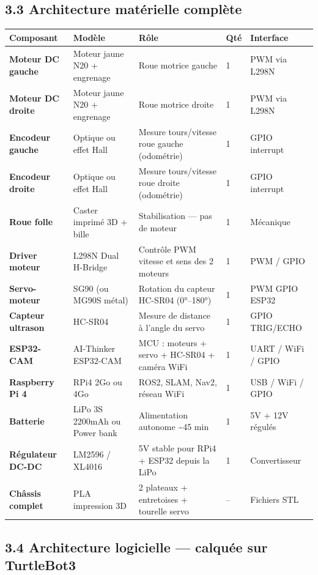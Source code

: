 \documentclass[12pt,a4paper]{article}
\begin{document}
\subsection{3.3 Architecture matérielle complète}

\begin{longtable}{>{\bfseries}p{2.8cm} p{3.2cm} p{3.5cm} p{0.6cm} p{2.2cm}}
\toprule
\textbf{Composant} & \textbf{Modèle} & \textbf{Rôle} & \textbf{Qté} & \textbf{Interface} \\
\midrule
\endhead
Moteur DC gauche & Moteur jaune N20 + engrenage & Roue motrice gauche & 1 & PWM via L298N \\
Moteur DC droite & Moteur jaune N20 + engrenage & Roue motrice droite & 1 & PWM via L298N \\
Encodeur gauche & Optique ou effet Hall & Mesure tours/vitesse roue gauche (odométrie) & 1 & GPIO interrupt \\
Encodeur droite & Optique ou effet Hall & Mesure tours/vitesse roue droite (odométrie) & 1 & GPIO interrupt \\
Roue folle & Caster imprimé 3D + bille & Stabilisation — pas de moteur & 1 & Mécanique \\
Driver moteur & L298N Dual H-Bridge & Contrôle PWM vitesse et sens des 2 moteurs & 1 & PWM / GPIO \\
Servo-moteur & SG90 (ou MG90S métal) & Rotation du capteur HC-SR04 (0°–180°) & 1 & PWM GPIO ESP32 \\
Capteur ultrason & HC-SR04 & Mesure de distance à l'angle du servo & 1 & GPIO TRIG/ECHO \\
ESP32-CAM & AI-Thinker ESP32-CAM & MCU : moteurs + servo + HC-SR04 + caméra WiFi & 1 & UART / WiFi / GPIO \\
Raspberry Pi 4 & RPi4 2Go ou 4Go & ROS2, SLAM, Nav2, réseau WiFi & 1 & USB / WiFi / GPIO \\
Batterie & LiPo 3S 2200mAh ou Power bank & Alimentation autonome \textasciitilde45 min & 1 & 5V + 12V régulés \\
Régulateur DC-DC & LM2596 / XL4016 & 5V stable pour RPi4 + ESP32 depuis la LiPo & 1 & Convertisseur \\
Châssis complet & PLA impression 3D & 2 plateaux + entretoises + tourelle servo & -- & Fichiers STL \\
\bottomrule
\end{longtable}

\subsection{3.4 Architecture logicielle — calquée sur TurtleBot3}
\end{document}
